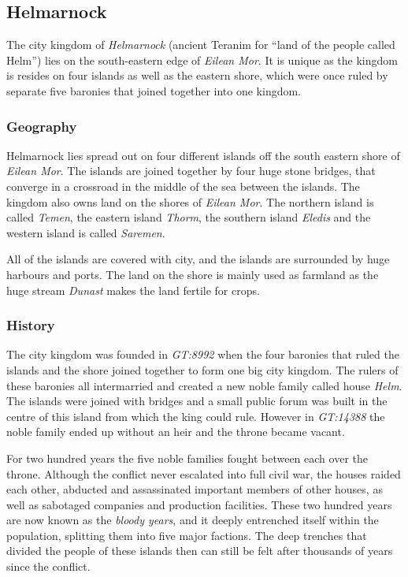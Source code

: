 \subsection{Helmarnock}
\label{sec:Helmarnock}

The city kingdom of \emph{Helmarnock} (ancient Teranim for ``land of the
people called Helm'') lies on the south-eastern edge of \emph{Eilean Mor}. It
is unique as the kingdom is resides on four islands as well as the eastern
shore, which were once ruled by separate five baronies that joined together
into one kingdom.

\subsubsection*{Geography}

Helmarnock lies spread out on four different islands off the south eastern
shore of \emph{Eilean Mor}. The islands are joined together by four huge
stone bridges, that converge in a crossroad in the middle of the sea between
the islands. The kingdom also owns land on the shores of \emph{Eilean Mor}.
The northern island is called \emph{Temen}, the eastern island \emph{Thorm},
the southern island \emph{Eledis} and the western island is called
\emph{Saremen}.

All of the islands are covered with city, and the islands are surrounded by
huge harbours and ports. The land on the shore is mainly used as farmland as
the huge stream \emph{Dunast} makes the land fertile for crops.

\subsubsection*{History}

The city kingdom was founded in \emph{GT:8992} when the four baronies that
ruled the islands and the shore joined together to form one big city kingdom.
The rulers of these baronies all intermarried and created a new noble family
called house \emph{Helm}. The islands were joined with bridges and a small
public forum was built in the centre of this island from which the king could
rule. However in \emph{GT:14388} the noble family ended up without an heir and
the throne became vacant.

For two hundred years the five noble families fought between each over the
throne. Although the conflict never escalated into full civil war, the houses
raided each other, abducted and assassinated important members of other
houses, as well as sabotaged companies and production facilities. These two
hundred years are now known as the \emph{bloody years}, and it deeply
entrenched itself within the population, splitting them into five major
factions. The deep trenches that divided the people of these islands then can
still be felt after thousands of years since the conflict.

